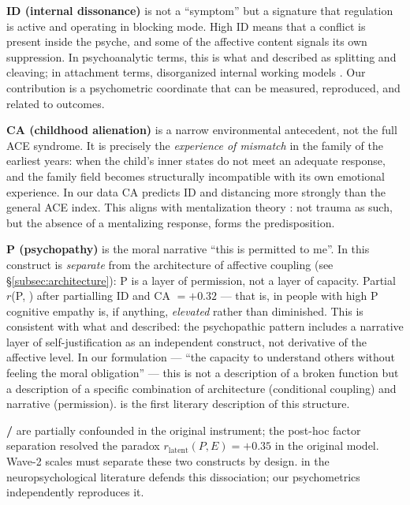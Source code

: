 \textbf{ID (internal dissonance)} is not a ``symptom'' but a signature that regulation is active and operating in blocking mode. High ID means that a conflict is present inside the psyche, and some of the affective content signals its own suppression. In psychoanalytic terms, this is what \citet{ferenczi1933} and \citet{klein1946} described as splitting and cleaving; in attachment terms, disorganized internal working models \citep{main1986}. Our contribution is a psychometric coordinate that can be measured, reproduced, and related to outcomes.

\textbf{CA (childhood alienation)} is a narrow environmental antecedent, not the full ACE syndrome. It is precisely the \emph{experience of mismatch} in the family of the earliest years: when the child's inner states do not meet an adequate response, and the family field becomes structurally incompatible with its own emotional experience. In our data CA predicts ID and distancing more strongly than the general ACE index. This aligns with mentalization theory \citep{fonagy2002}: not trauma as such, but the absence of a mentalizing response, forms the predisposition.

\textbf{P (psychopathy)} is the moral narrative ``this is permitted to me''. In \DEIC{} this construct is \emph{separate} from the architecture of affective coupling (see §\ref{subsec:architecture}): P is a layer of permission, not a layer of capacity. Partial $r$(P, \Ecog{}) after partialling ID and CA $= +0.32$ --- that is, in people with high P cognitive empathy is, if anything, \emph{elevated} rather than diminished. This is consistent with what \citet{blair1995, blair2013} and \citet{baroncohen2011} described: the psychopathic pattern includes a narrative layer of self-justification as an independent construct, not derivative of the affective level. In our formulation --- ``the capacity to understand others without feeling the moral obligation'' --- this is not a description of a broken function but a description of a specific combination of architecture (conditional coupling) and narrative (permission). \citet{cleckley1941} is the first literary description of this structure.

\textbf{\EAF{} / \Ecog{}} are partially confounded in the original instrument; the post-hoc factor separation resolved the paradox $r_{\mathrm{latent}}(P, E) = +0.35$ in the original model. Wave-2 scales must separate these two constructs by design. \citet{shamaytsoory2011} in the neuropsychological literature defends this dissociation; our psychometrics independently reproduces it.

